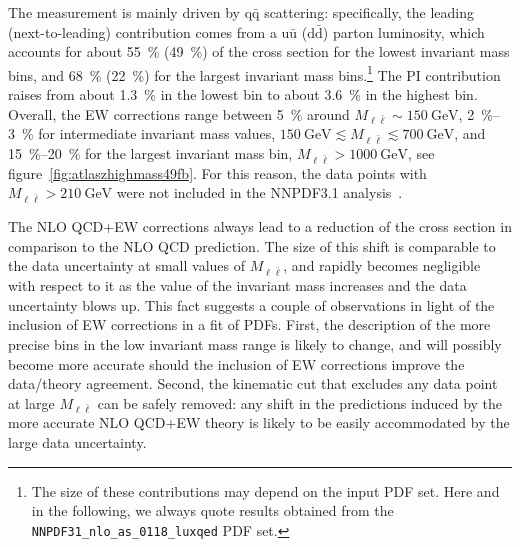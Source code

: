 The measurement is mainly driven by $\mathrm{q}\bar{\mathrm{q}}$ scattering: specifically, the
leading (next-to-leading) contribution comes from a $\mathrm{u}\bar{\mathrm{u}}$ ($\mathrm{d}\bar{\mathrm{d}}$)
parton luminosity, which accounts for about \SI{55}{\percent} (\SI{49}{\percent}) of the cross section
for the lowest invariant mass bins, and \SI{68}{\percent} (\SI{22}{\percent}) for the largest invariant
mass bins.\footnote{The size of these contributions may depend on the input PDF
  set. Here and in the following, we always quote results obtained from the
  \texttt{NNPDF31\_nlo\_as\_0118\_luxqed} PDF set.}
The PI contribution raises from about \SI{1.3}{\percent} in the lowest bin to
about \SI{3.6}{\percent} in the highest bin. Overall, the EW corrections range between \SI{5}{\percent}
around $M_{\ell\bar\ell}\sim \SI{150}{\giga\electronvolt}$, \SIrange{2}{3}{\percent} for intermediate invariant mass
values, $\SI{150}{\giga\electronvolt}\lesssim M_{\ell\bar\ell}\lesssim \SI{700}{\giga\electronvolt}$, and
\SIrange{15}{20}{\percent} for the largest invariant mass bin, $M_{\ell\bar\ell}>\SI{1000}{\giga\electronvolt}$,
see figure~\ref{fig:atlaszhighmass49fb}. For this reason, the data points with
$M_{\ell\bar\ell}>\SI{210}{\giga\electronvolt}$ were not included in the NNPDF3.1
analysis~\cite{Ball:2017nwa}.

The NLO QCD+EW corrections always lead to a reduction of the cross section in
comparison to the NLO QCD prediction. The size of this shift is comparable to
the data uncertainty at small values of $M_{\ell\bar\ell}$, and rapidly becomes
negligible with respect to it as the value of the invariant mass increases
and the data uncertainty blows up. This fact suggests a couple of observations
in light of the inclusion of EW corrections in a fit of PDFs. First, the
description of the more precise bins in the low invariant mass range is likely
to change, and will possibly become more accurate should the inclusion of EW
corrections improve the data/theory agreement. Second, the kinematic cut that
excludes any data point at large $M_{\ell\bar\ell}$ can be safely removed: any
shift in the predictions induced by the more accurate NLO QCD+EW theory is
likely to be easily accommodated by the large data uncertainty.

